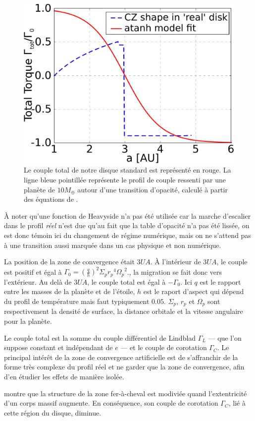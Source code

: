 \begin{figure}[htb]
\centering
\includegraphics[width=0.49\linewidth]{figure/shifted/torque_zoom_CZ1.pdf}
\caption{Le couple total de notre disque standard est représenté en rouge. La ligne bleue pointillée représente le profil de couple ressenti par une planète de $10\unit{M_\oplus}$ autour d'une transition d'opacité, calculé à partir des équations de \cite{paardekooper2011torque}.}\label{fig:shifted_CZ_torque_prof}
\end{figure}

À noter qu'une fonction de Heavyside n'a pas été utilisée car la marche d'escalier dans le profil \textit{réel} n'est due qu'au fait que la table d'opacité n'a pas été lissée, on est donc témoin ici du changement de régime numérique, mais on ne s'attend pas à une transition aussi marquée dans un cas physique et non numérique.

La position de la zone de convergence était $3\unit{UA}$. À l'intérieur de $3\unit{UA}$, le couple est positif et égal à $\Gamma_0 = \left(\frac{q}{h}\right)^2\Sigma_p {r_p}^4 {\Omega_p}^2$., la migration se fait donc vers l'extérieur. Au delà de $3\unit{UA}$, le couple total est égal à $-\Gamma_0$. Ici $q$ est le rapport entre les masses de la planète et de l'étoile, $h$ est le raport d'aspect qui dépend du profil de température mais faut typiquement $0.05$. $\Sigma_p$, $r_p$ et $\Omega_p$ sont respectivement la densité de surface, la distance orbitale et la vitesse angulaire pour la planète. 

Le couple total est la somme du couple différentiel de Lindblad $\Gamma_L$ --- que l'on suppose constant et indépendant de $e$ --- et le couple de corotation $\Gamma_C$. Le principal intérêt de la zone de convergence artificielle est de s'affranchir de la forme très complexe du profil réel et ne garder que la zone de convergence, afin d'en étudier les effets de manière isolée.

\bigskip

\cite{bitsch2010orbital} montre que la structure de la zone fer-à-cheval est modiviée quand l'extentricité d'un corps massif augmente. En conséquence, son couple de corotation $\Gamma_C$, lié à cette région du disque, diminue. 

